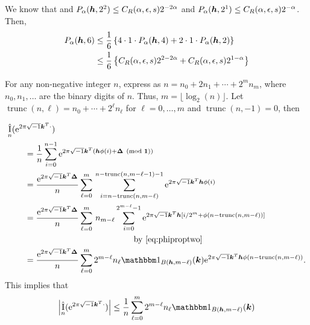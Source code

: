 \documentclass{amsart}
\DeclareMathOperator{\appxint}{\hat{I}}
\DeclareMathOperator{\trun}{trunc}
\begin{document}
We know that and $P_\alpha(\boldsymbol{h},2^2) \le C_{R}(\alpha,\epsilon,s)
    2^{-2\alpha}$ and $P_\alpha(\boldsymbol{h},2^1) \le C_{R}(\alpha,\epsilon,s)
    2^{-\alpha} $. Then,
    \begin{align*}
        P_\alpha(\boldsymbol{h},6) & \le \frac {1}{6} \left\{ 4 \cdot 1 \cdot P_\alpha(\boldsymbol{h},4) + 2 \cdot 1 \cdot P_\alpha(\boldsymbol{h},2) \right\} \\
         & \le \frac {1}{6} \left\{C_{R}(\alpha,\epsilon,s)
         2^{2-2\alpha} + C_{R}(\alpha,\epsilon,s)
         2^{1-\alpha} \right\}
    \end{align*}

    
For any non-negative integer $n$, express as  $n = n_0 + 2n_1 + \cdots + 2^m n_m$, where $n_0, n_1, \ldots$ are the binary digits of $n$.  Thus, $m = \lfloor \log_2(n) \rfloor$.  Let $\trun(n,\ell) = n_0 + \cdots + 2^{\ell} n_{\ell}$ for $\ell = 0, \ldots, m$ and $\trun(n,-1) = 0$, then 

\begin{align*}
    \MoveEqLeft{\appxint_{n}(\me^{2 \pi \sqrt{-1} \vk^T \cdot}) } \\
    &= \frac 1{n} \sum_{i=0}^{n-1} \me^{2 \pi \sqrt{-1} \vk^T (\vh\phi(i) + \vDelta \pmod{\vone})} \\
    \nonumber
    &= \frac {\me^{2 \pi \sqrt{-1} \vk^T \vDelta}}{n} \sum_{\ell = 0}^{m} \, 
    \sum_{i=n - \trun(n,m-\ell) }^{n - \trun(n,m-\ell-1)  -1} \me^{2 \pi \sqrt{-1} \vk^T \vh\phi(i)} \\
    &= \frac {\me^{2 \pi \sqrt{-1} \vk^T \vDelta}}{n} \sum_{\ell = 0}^{m} \, n_{m-\ell}
    \sum_{i=0 }^{2^{m-\ell}  -1} \me^{2 \pi \sqrt{-1} \vk^T \vh[i/2^m + \phi(n - \trun(n,m-\ell))]} \\
    & \hspace{30ex} \text{by \eqref{eq:phiproptwo}} \\
    & = \frac {\me^{2 \pi \sqrt{-1} \vk^T \vDelta}}{n} \sum_{\ell = 0}^{m} 2^{m-\ell} n_\ell \bbone_{B(\vh,m-\ell)}(\vk) \me^{2 \pi \sqrt{-1} \vk^T \vh\phi(n - \trun(n,m-\ell))}.
\end{align*}
This implies that
\begin{equation} \label{eq:ihatarbn}
    \abs{\appxint_{n}(\me^{2 \pi \sqrt{-1} \vk^T \cdot})} \le \frac {1}{n} \sum_{\ell = 0}^{m} 2^{m-\ell} n_\ell \bbone_{B(\vh,m-\ell)}(\vk)
\end{equation}
\end{document}
